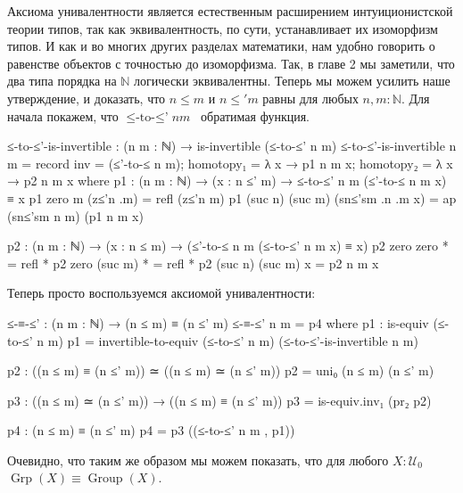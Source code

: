 \documentclass{article}[12pt]
\newcommand{\dash}{\textemdash\ }
\newcommand{\op}{\operatorname}
\begin{document}
Аксиома унивалентности является естественным расширением интуиционистской теории типов, так как
эквивалентность, по сути, устанавливает их изоморфизм типов. И как и во многих других
разделах математики, нам удобно говорить о равенстве объектов с точностью до изоморфизма.
Так, в главе 2 мы заметили, что два типа порядка на $\mathbb{N}$ логически эквивалентны.
Теперь мы можем усилить наше утверждение, и доказать, что $n \leq m$ и $n \leq' m$ равны
для любых $n, m : \mathbb{N}$. Для начала покажем, что $\op{≤-to-≤’} n m$ \dash обратимая
функция.
\begin{code}
≤-to-≤'-is-invertible : (n m : ℕ) → is-invertible (≤-to-≤' n m)
≤-to-≤'-is-invertible n m = 
    record {inv = (≤'-to-≤ n m);
            homotopy₁ = λ x → p1 n m x;
            homotopy₂ = λ x → p2 n m x}
    where
        p1 : (n m : ℕ) → (x : n ≤' m) → ≤-to-≤' n m (≤'-to-≤ n m x) ≡ x
        p1 zero m (z≤'n .m) = refl (z≤'n m)
        p1 (suc n) (suc m) (sn≤'sm .n .m x) = ap (sn≤'sm n m) (p1 n m x)

        p2 : (n m : ℕ) → (x : n ≤ m) → (≤'-to-≤ n m (≤-to-≤' n m x) ≡ x)
        p2 zero zero * = refl *
        p2 zero (suc m) * = refl *
        p2 (suc n) (suc m) x = p2 n m x
\end{code}
Теперь просто воспользуемся аксиомой унивалентности:
\begin{code}
≤-≡-≤' : (n m : ℕ) → (n ≤ m) ≡ (n ≤' m)
≤-≡-≤' n m = p4
    where
        p1 : is-equiv (≤-to-≤' n m)
        p1 = invertible-to-equiv (≤-to-≤' n m) (≤-to-≤'-is-invertible n m)

        p2 : ((n ≤ m) ≡ (n ≤' m)) ≃ ((n ≤ m) ≃ (n ≤' m))
        p2 = uni₀ (n ≤ m) (n ≤' m)

        p3 :  ((n ≤ m) ≃ (n ≤' m)) → ((n ≤ m) ≡ (n ≤' m))
        p3 = is-equiv.inv₁ (pr₂ p2)

        p4 : (n ≤ m) ≡ (n ≤' m)
        p4 = p3 ((≤-to-≤' n m , p1))
\end{code}

Очевидно, что таким же образом мы можем показать, что для любого $X : \mathcal{U}_0$ 
$\op{Grp}(X) \equiv \op{Group}(X)$.
\end{document}
